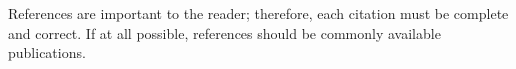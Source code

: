 	
	References are important to the reader; therefore, each citation must be complete and correct. If at all possible, references should be commonly available publications.
%	

	
%		
